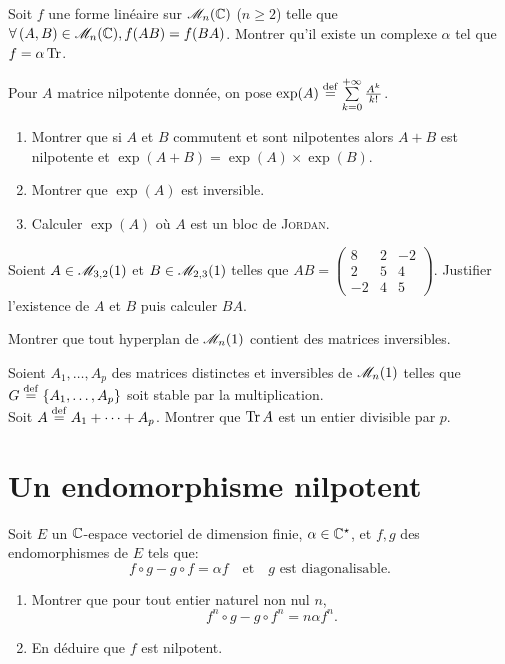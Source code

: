 \begin{exercice}
    Soit $f$ une forme linéaire sur $\mathscr{M}_n(\mathbb{C})$ ($n\geqslant2$) telle que $\forall (A, B) \in \M_n(\C), f(AB) = f(BA)$. Montrer qu'il existe un complexe $\alpha$ tel que $f = \alpha \Tr$.
\end{exercice}

\begin{exercice}
    Pour $A$ matrice nilpotente donnée, on pose $\exp(A) \overset{\mathrm{\tiny def}}{=} \sum\limits_{k=0}^{+\infty} \frac{A^k}{k!}$.
    \begin{enumerate}
        \item Montrer que si $A$ et $B$ commutent et sont nilpotentes alors $A+B$ est nilpotente et $\exp(A+B) = \exp(A) \times \exp(B)$.
        \item Montrer que $\exp(A)$ est inversible.
        \item Calculer $\exp(A)$ où $A$ est un bloc de \textsc{Jordan}.
    \end{enumerate}
\end{exercice}

\begin{exercice}
    Soient $A \in \mathscr{M}_{3, 2}(1)$ et $B \in \mathscr{M}_{2, 3}(1)$ telles que $AB = 
    \begin{pmatrix}
        8 & 2 & -2 \\
        2 & 5 & 4 \\
        -2 & 4 & 5
    \end{pmatrix}
    $. Justifier l'existence de $A$ et $B$ puis calculer $BA$.
\end{exercice}

\begin{exercice}
    Montrer que tout hyperplan de $\mathscr{M}_n(1)$ contient des matrices inversibles.
\end{exercice}

\begin{exercice}
    Soient $A_1, \dots, A_p$ des matrices distinctes et inversibles de $\mathscr{M}_n(1)$ telles que $G \overset{\mathrm{\tiny def}}{=} \{ A_1, \dots, A_p \}$ soit stable par la multiplication. \\
    Soit $A \overset{\mathrm{\tiny def}}{=} A_1 + \cdots + A_p$. Montrer que $\Tr A$ est un entier divisible par $p$.
\end{exercice}

\section{Un endomorphisme nilpotent}

\begin{exercice}
    Soit $E$ un $\mathbb{C}$-espace vectoriel de dimension finie, $\alpha \in \mathbb{C}^\star$, et $f, g$ des endomorphismes de $E$ tels que:
    $$f \circ g - g \circ f = \alpha f \quad \text{et} \quad g \text{ est diagonalisable}.$$
    \begin{enumerate}
        \item Montrer que pour tout entier naturel non nul $n$, $$f^n \circ g - g \circ f^n = n \alpha f^n.$$
        \item En déduire que $f$ est nilpotent. 
    \end{enumerate}
\end{exercice}